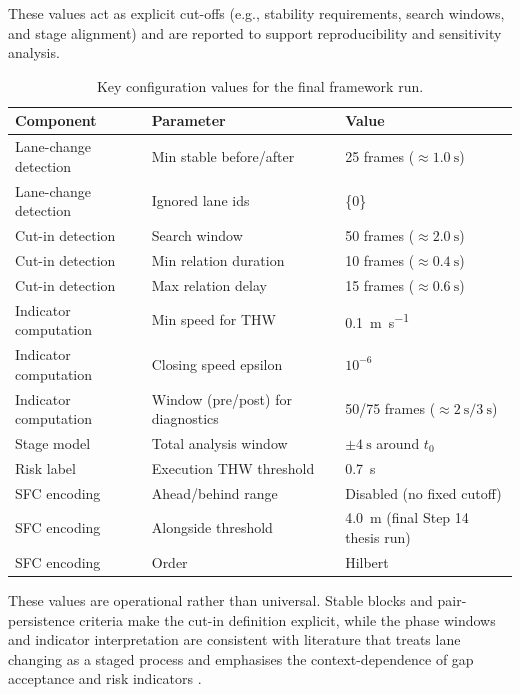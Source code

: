 \documentclass[12pt,a4paper,twoside,openright]{report}
\begin{document}
    These values act as explicit cut-offs (e.g., stability requirements, search windows, and stage alignment) and are reported to support reproducibility and sensitivity analysis.

    \begin{table}[H]
        \centering
        \caption{Key configuration values for the final framework run.}
        \label{tab:config}
        {\small
        \setlength{\tabcolsep}{4pt}
            \begin{tabularx}{\textwidth}{@{}l l X@{}}
\toprule
Component & Parameter & Value \\
\midrule
Lane-change detection & Min stable before/after & 25 frames ($\approx \SI{1.0}{\second}$) \\
Lane-change detection & Ignored lane ids & \{0\} \\
Cut-in detection & Search window & 50 frames ($\approx \SI{2.0}{\second}$) \\
Cut-in detection & Min relation duration & 10 frames ($\approx \SI{0.4}{\second}$) \\
Cut-in detection & Max relation delay & 15 frames ($\approx \SI{0.6}{\second}$) \\
Indicator computation & Min speed for THW & \SI{0.1}{\meter\per\second} \\
Indicator computation & Closing speed epsilon & $10^{-6}$ \\
Indicator computation & Window (pre/post) for diagnostics & 50/75 frames ($\approx \SI{2}{\second}/\SI{3}{\second}$) \\
Stage model & Total analysis window & $\pm \SI{4}{\second}$ around $t_0$ \\
Risk label & Execution THW threshold & \SI{0.7}{\second} \\
SFC encoding & Ahead/behind range & Disabled (no fixed cutoff) \\
SFC encoding & Alongside threshold & \SI{4.0}{\meter} (final Step 14 thesis run) \\
SFC encoding & Order & Hilbert \\
\bottomrule
            \end{tabularx}}
    \end{table}

    These values are operational rather than universal. Stable blocks and pair-persistence criteria make the cut-in definition explicit, while the phase windows and indicator interpretation are consistent with literature that treats lane changing as a staged process and emphasises the context-dependence of gap acceptance and risk indicators \cite{wang2019cutin,zhou2016riskperception,hwang2022fsmrl}.
\end{document}
